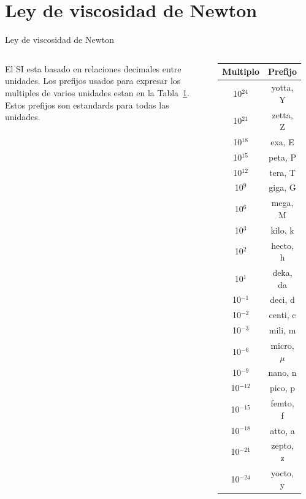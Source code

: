 \documentclass [xcolor=svgnames, t] {beamer}
\begin{document}
\section{Ley de viscosidad de Newton}
\begin{frame}{Ley de viscosidad de Newton}
\vspace{-1.0cm}
\begin{columns}
\begin{exampleblock}{}
El SI esta basado en relaciones decimales entre unidades. Los prefijos usados para expresar los multiples de varios unidades estan en la Tabla~\ref{t1}. Estos prefijos son estandards para todas las unidades.
\end{exampleblock}{}

\scriptsize
\begin{table}[h!]
\centering
\begin{tabular}{c c}
 \hline
 Multiplo & Prefijo \\ [0.5ex]
 \hline\hline
 10$^{24}$ & yotta, Y \\
 10$^{21}$ & zetta, Z \\
 10$^{18}$ & exa, E \\
 10$^{15}$ & peta, P \\
 10$^{12}$ & tera, T \\
 10$^{9}$ & giga, G \\
 10$^{6}$ & mega, M \\
 10$^{3}$ & kilo, k \\
 10$^{2}$ & hecto, h \\
 10$^{1}$ & deka, da \\
 10$^{-1}$ & deci, d \\
 10$^{-2}$ & centi, c \\
 10$^{-3}$ & mili, m \\
 10$^{-6}$ & micro, $\mu$ \\
 10$^{-9}$ & nano, n \\
 10$^{-12}$ & pico, p \\
 10$^{-15}$ & femto, f \\
 10$^{-18}$ & atto, a \\
 10$^{-21}$ & zepto, z \\
 10$^{-24}$ & yocto, y \\ [1ex]
  \hline
\end{tabular}
\label{t1}
\end{table}
\end{columns}
\end{frame}
\end{document}
